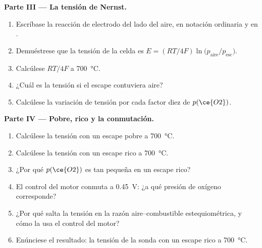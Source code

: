 \begin{problem}
\medskip\noindent\textbf{Parte III --- La tensión de Nernst.}
\begin{enumerate}[resume]
  \item Escríbase la reacción de electrodo del lado del aire, en notación ordinaria y en
        .
  \item Demuéstrese que la tensión de la celda es $E = (RT/4F)\ln\bigl(p_{\mathrm{aire}}/p_{\mathrm{esc}}\bigr)$.
  \item Calcúlese $RT/4F$ a \qty{700}{\celsius}.
  \item ¿Cuál es la tensión si el escape contuviera aire?
  \item Calcúlese la variación de tensión por cada factor diez de $p(\ce{O2})$.
\end{enumerate}

\medskip\noindent\textbf{Parte IV --- Pobre, rico y la conmutación.}
\begin{enumerate}[resume]
  \item Calcúlese la tensión con un escape pobre a \qty{700}{\celsius}.
  \item Calcúlese la tensión con un escape rico a \qty{700}{\celsius}.
  \item ¿Por qué $p(\ce{O2})$ es tan pequeña en un escape rico?
  \item El control del motor conmuta a \qty{0.45}{V}: ¿a qué presión de oxígeno
        corresponde?
  \item ¿Por qué salta la tensión en la razón aire--combustible estequiométrica, y cómo
        la usa el control del motor?
  \item Enúnciese el resultado: la tensión de la sonda con un escape rico a \qty{700}{\celsius}.
\end{enumerate}
\end{problem}
